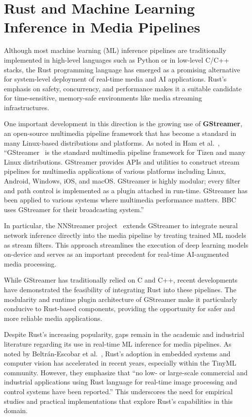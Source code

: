 \section{Rust and Machine Learning Inference in Media Pipelines}

Although most machine learning (ML) inference pipelines are traditionally implemented in high-level languages such as Python or in low-level C/C++ stacks, the Rust programming language has emerged as a promising alternative for system-level deployment of real-time media and AI applications. Rust's emphasis on safety, concurrency, and performance makes it a suitable candidate for time-sensitive, memory-safe environments like media streaming infrastructures.

One important development in this direction is the growing use of \textbf{GStreamer}, an open-source multimedia pipeline framework that has become a standard in many Linux-based distributions and platforms. As noted in Ham et al.~\cite{ham2019nnstreamer}, ``GStreamer~\cite{gstreamer1999} is the standard multimedia pipeline framework for Tizen and many Linux distributions. GStreamer provides APIs and utilities to construct stream pipelines for multimedia applications of various platforms including Linux, Android, Windows, iOS, and macOS. GStreamer is highly modular; every filter and path control is implemented as a plugin attached in run-time. GStreamer has been applied to various systems where multimedia performance matters. BBC uses GStreamer for their broadcasting system.''

In particular, the NNStreamer project~\cite{ham2019nnstreamer} extends GStreamer to integrate neural network inference directly into the media pipeline by treating trained ML models as stream filters. This approach streamlines the execution of deep learning models on-device and serves as an important precedent for real-time AI-augmented media processing.

While GStreamer has traditionally relied on C and C++, recent developments have demonstrated the feasibility of integrating Rust into these pipelines. The modularity and runtime plugin architecture of GStreamer make it particularly conducive to Rust-based components, providing the opportunity for safer and more reliable media applications.

Despite Rust's increasing popularity, gaps remain in the academic and industrial literature regarding its use in real-time ML inference for media pipelines. As noted by Beltrán-Escobar et al.~\cite{beltran2024review}, Rust's adoption in embedded systems and computer vision has accelerated in recent years, especially within the TinyML community. However, they emphasize that “no low- or large-scale commercial and industrial applications using Rust language for real-time image processing and control systems have been reported.” This underscores the need for empirical studies and practical implementations that explore Rust's capabilities in this domain.

